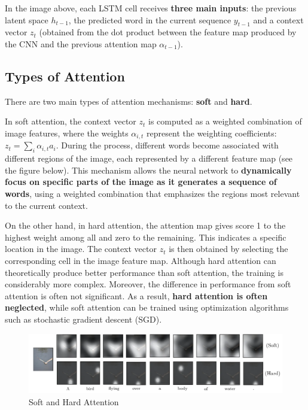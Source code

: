 In the image above, each LSTM cell receives \textbf{three main inputs}: the previous latent space $h_{t-1}$, the predicted word in the current sequence $ y_{t-1} $ and a context vector $ z_{t} $ (obtained from the dot product between the feature map produced by the CNN and the previous attention map $\alpha_{t-1}$). 

\subsection{Types of Attention}

There are two main types of attention mechanisms: \textbf{soft} and \textbf{hard}.

In soft attention, the context vector $z_t$ is computed as a weighted combination of image features, where the weights $\alpha_{i,t}$ represent the weighting coefficients: $z_t = \sum_{i}\alpha_{i,t}a_i$.  During the process, different words become associated with different regions of the image, each represented by a different feature map (see the figure below). This mechanism allows the neural network to \textbf{dynamically focus on specific parts of the image as it generates a sequence of words}, using a weighted combination that emphasizes the regions most relevant to the current context.

On the other hand, in hard attention, the attention map gives score 1 to the highest weight among all and zero to the remaining. This indicates a specific location in the image. The context vector $z_t$ is then obtained by selecting the corresponding cell in the image feature map. Although hard attention can theoretically produce better performance than soft attention, the training is considerably more complex. Moreover, the difference in performance from soft attention is often not significant. As a result, \textbf{hard attention is often neglected}, while soft attention can be trained using optimization algorithms such as stochastic gradient descent (SGD).

\begin{figure}[!htbp]
    \centering
    \includegraphics[width=\linewidth]{tikz/chapter7 - Attention Types.pdf}
    \caption{Soft and Hard Attention}
\end{figure}

